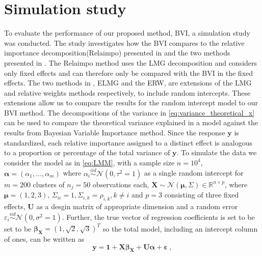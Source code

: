 


\section{Simulation study}
\label{sec:simulations}
To evaluate the performance of our proposed method, BVI, a simulation study was conducted. The study investigates how the BVI compares to the relative importance decomposition(Relaimpo) presented in \citet{gromping_relaimpo} and the two methods presented in \citet{matre}.
The Relaimpo method uses the LMG decomposition and considers only fixed effects and can therefore only be compared with the BVI in the fixed effects. The two methods in \citet{matre}, ELMG and the ERW, are extensions of the LMG and relative weights methods respectively, to include random intercepts.
These extensions allow us to compare the results for the random intercept model to our BVI method. The decompositions of the variance in \eqref{eq:variance_theoretical_x} can be used to compare the theoretical variance explained in a model against the results from Bayesian Variable Importance method.
Since the response $\mathbf{y}$ is standardized, each relative importance assigned to a distinct effect is analogous to a proportion or percentage of the total variance of $\mathbf{y}$.
\newline
\newline
To simulate the data we consider the model as in \eqref{eq:LMM}, with a sample size $n=10^4$, $\boldsymbol{\alpha}=(\alpha_1, ..., \alpha_m)$ where $\alpha_i \stackrel{iid}{\sim} \mathcal{N}(0, \tau^2=1)$ as a single random intercept for $m=200$ clusters of $n_j=50$ observations each, $\mathbf{X} \sim \mathcal{N}(\boldsymbol{\mu},\Sigma) \in \mathbb{R}^{n \times p}$, where $\boldsymbol{\mu}=(1, 2, 3)$, $\Sigma_{ii} = 1, \Sigma_{i, k}=\rho_{i, k}, k\neq i$ and $p=3$ consisting of three fixed effects, $\mathbf{U}$ as a desgin matrix of appropriate dimension and a random error $\varepsilon_i \stackrel{iid}{\sim} \mathcal{N}(0, \sigma^2=1)$. 
Further, the true vector of regression coefficients is set to be set to be $\boldsymbol{\beta}_{\mathbf{X}}=(1, \sqrt{2}, \sqrt{3})^T$ so the total model, including an intercept column of ones, can be written as
\begin{equation}
    \label{eq:simulation_model}
    \mathbf{y} = \mathbf{1} + \mathbf{X}\boldsymbol{\beta}_{\mathbf{X}} + \mathbf{U}\boldsymbol{\alpha} + \boldsymbol{\varepsilon} \ ,
\end{equation}
